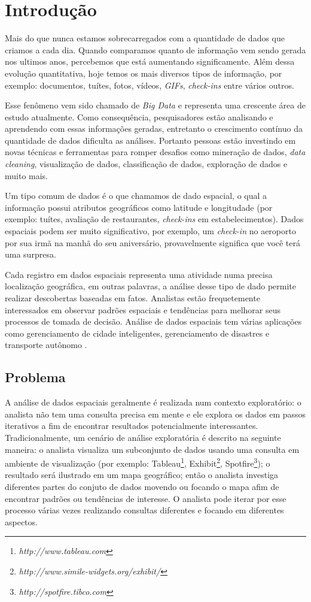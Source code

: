 \chapter{Introdução}
\label{chap:introducao}

Mais do que nunca estamos sobrecarregados com a quantidade de dados que criamos a cada dia. Quando comparamos quanto de informação vem sendo gerada nos ultimos anos, percebemos que está aumentando significamente. Além dessa evolução quantitativa, hoje temos os mais diversos tipos de informação, por exemplo: documentos, tuítes, fotos, vídeos, \textit{GIFs}, \textit{check-ins} entre vários outros.

Esse fenômeno vem sido chamado de \textit{Big Data} e representa uma crescente área de estudo atualmente. Como consequência, pesquisadores estão analisando e aprendendo com essas informações geradas, entretanto o crescimento contínuo da quantidade de dados dificulta as análises. Portanto pessoas estão investindo em novas técnicas e ferramentas para romper desafios como mineração de dados, {\em data cleaning}, visualização de dados, classificação de dados, exploração de dados e muito mais.

Um tipo comum de dados é o que chamamos de dado espacial, o qual a informação possui atributos geográficos como latitude e longitudade (por exemplo: tuítes, avaliação de restaurantes, {\em check-ins} em estabelecimentos). Dados espaciais podem ser muito significativo, por exemplo, um {\em check-in} no aeroporto por sua irmã na manhã do seu aniversário, provavelmente significa que você terá uma surpresa.

Cada registro em dados espaciais representa uma atividade numa precisa localização geográfica, em outras palavras, a análise desse tipo de dado permite realizar descobertas baseadas em fatos. Analistas estão frequetemente interessados em observar padrões espaciais e tendências para melhorar seus processos de tomada de decisão. Análise de dados espaciais tem várias aplicações como gerenciamento de cidade inteligentes, gerenciamento de disastres e transporte autônomo \cite{RoddickEHPS04,Telang:2012}.

\section{Problema}

A análise de dados espaciais geralmente é realizada num contexto exploratório: o analista não tem uma consulta precisa em mente e ele explora os dados em passos iterativos a fim de encontrar resultados potencialmente interessantes. Tradicionalmente, um cenário de análise exploratória é descrito na seguinte maneira: o analista visualiza um subconjunto de dados usando uma consulta em ambiente de visualização (por exemplo: Tableau\footnote{\it http://www.tableau.com},
Exhibit\footnote{\it http://www.simile-widgets.org/exhibit/},
Spotfire\footnote{\it http://spotfire.tibco.com}); o resultado será ilustrado em um mapa geográfico; então o analista investiga diferentes partes do conjuto de dados movendo ou focando o mapa afim de encontrar padrões ou tendências de interesse. O analista pode iterar por esse processo várias vezes realizando consultas diferentes e focando em diferentes aspectos.

